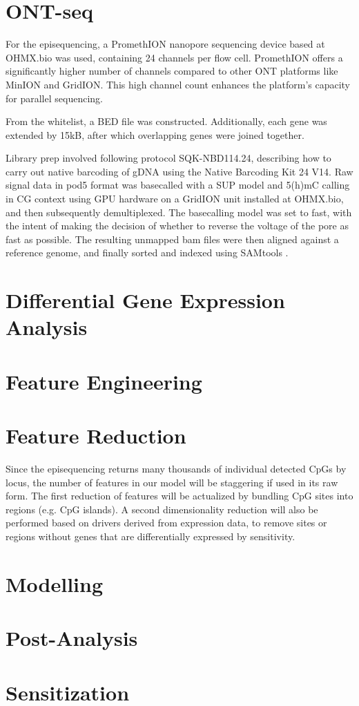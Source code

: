 \section{ONT-seq}

For the episequencing, a PromethION nanopore sequencing device based at OHMX.bio was used, containing 24 channels per flow cell. PromethION offers a significantly higher number of channels compared to other ONT platforms like MinION and GridION. This high channel count enhances the platform's capacity for parallel sequencing.

From the whitelist, a BED file was constructed. Additionally, each gene was extended by 15kB, after which overlapping genes were joined together.

Library prep involved following protocol SQK-NBD114.24, describing how to carry out native barcoding of \ac{gDNA} using the Native Barcoding Kit 24 V14. Raw signal data in pod5 format was basecalled with a SUP model and 5(h)mC calling in CG context using GPU hardware on a GridION unit installed at OHMX.bio, and then subsequently demultiplexed. The basecalling model was set to fast, with the intent of making the decision of whether to reverse the voltage of the pore as fast as possible. The resulting unmapped bam files were then aligned against a reference genome, and finally sorted and indexed using SAMtools \citep{samtools}.

\section{Differential Gene Expression Analysis}



\section{Feature Engineering}



\section{Feature Reduction}

Since the episequencing returns many thousands of individual detected CpGs by locus, the number of features in our model will be staggering if used in its raw form. The first reduction of features will be actualized by bundling CpG sites into regions (e.g. CpG islands). A second dimensionality reduction will also be performed based on drivers derived from expression data, to remove sites or regions without genes that are differentially expressed by sensitivity.

\section{Modelling}

\section{Post-Analysis}

\section{Sensitization}
